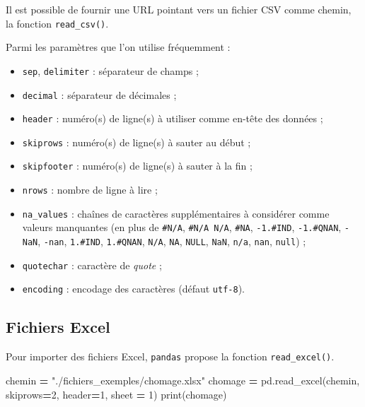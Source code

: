 \documentclass[12pt,]{book}
\newenvironment{Shaded}{\begin{snugshade}}{\end{snugshade}}
\newcommand{\DecValTok}[1]{\textcolor[rgb]{0.00,0.00,0.81}{#1}}
\newcommand{\StringTok}[1]{\textcolor[rgb]{0.31,0.60,0.02}{#1}}
\newcommand{\OperatorTok}[1]{\textcolor[rgb]{0.81,0.36,0.00}{\textbf{#1}}}
\newcommand{\BuiltInTok}[1]{#1}
\newcommand{\NormalTok}[1]{#1}
\providecommand{\tightlist}{%
  \setlength{\itemsep}{0pt}\setlength{\parskip}{0pt}}
\numberwithin{equation}{section}
\numberwithin{countremarque}{section}
\begin{document}
Il est possible de fournir une URL pointant vers un fichier CSV comme
chemin, la fonction \texttt{read\_csv()}.

Parmi les paramètres que l'on utilise fréquemment :

\begin{itemize}
\tightlist
\item
  \texttt{sep}, \texttt{delimiter} : séparateur de champs ;
\item
  \texttt{decimal} : séparateur de décimales ;
\item
  \texttt{header} : numéro(s) de ligne(s) à utiliser comme en-tête des
  données ;
\item
  \texttt{skiprows} : numéro(s) de ligne(s) à sauter au début ;
\item
  \texttt{skipfooter} : numéro(s) de ligne(s) à sauter à la fin ;
\item
  \texttt{nrows} : nombre de ligne à lire ;
\item
  \texttt{na\_values} : chaînes de caractères supplémentaires à
  considérer comme valeurs manquantes (en plus de \texttt{\#N/A},
  \texttt{\#N/A\ N/A}, \texttt{\#NA}, \texttt{-1.\#IND},
  \texttt{-1.\#QNAN}, \texttt{-NaN}, \texttt{-nan}, \texttt{1.\#IND},
  \texttt{1.\#QNAN}, \texttt{N/A}, \texttt{NA}, \texttt{NULL},
  \texttt{NaN}, \texttt{n/a}, \texttt{nan}, \texttt{null}) ;
\item
  \texttt{quotechar} : caractère de \emph{quote} ;
\item
  \texttt{encoding} : encodage des caractères (défaut \texttt{utf-8}).
\end{itemize}

\subsection{Fichiers Excel}\label{pandas-importation-excel}

Pour importer des fichiers Excel, \texttt{pandas} propose la fonction
\texttt{read\_excel()}.

\begin{Shaded}
\begin{Highlighting}[]
\NormalTok{chemin }\OperatorTok{=} \StringTok{"./fichiers_exemples/chomage.xlsx"}
\NormalTok{chomage }\OperatorTok{=}\NormalTok{ pd.read_excel(chemin, skiprows}\OperatorTok{=}\DecValTok{2}\NormalTok{, header}\OperatorTok{=}\DecValTok{1}\NormalTok{, sheet }\OperatorTok{=} \DecValTok{1}\NormalTok{)}
\BuiltInTok{print}\NormalTok{(chomage)}
\end{Highlighting}
\end{Shaded}
\end{document}
